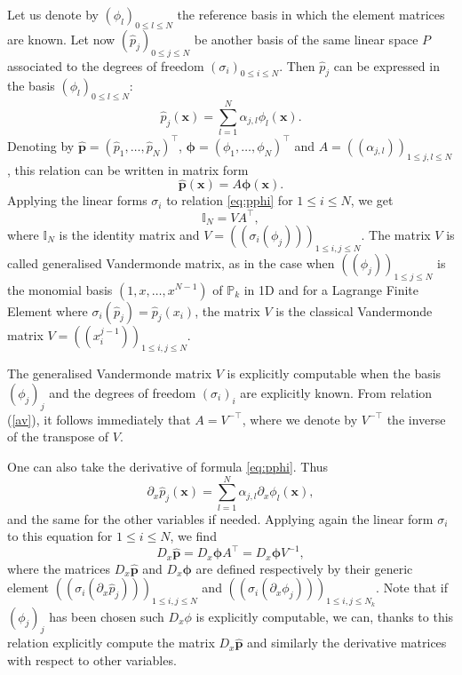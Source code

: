 Let us denote by $(\phi_l)_{0\leq l\leq N}$ the reference basis in which the element matrices are known. 
Let now $(\hat{p}_j)_{0\leq j\leq N}$ be another basis of the same linear space $P$ associated to the degrees of freedom $(\sigma_i)_{0\leq i\leq N}$.
Then $\hat{p}_j$ can be expressed in the basis $(\phi_l)_{0\leq l\leq N}$:
\begin{equation}\label{eq:pphi}
\hat{p}_j(\mathbf{x}) = \sum_{l=1}^{N} \alpha_{j,l} \phi_l(\mathbf{x}).
\end{equation}
Denoting by $\hat{\mathbf{p}}=(\hat{p}_1,\dots,\hat{p}_{N})^\top$, $\boldsymbol{\phi}=(\phi_1,\dots,\phi_{N})^\top$ and $A=((\alpha_{j,l}))_{1\leq j,l \leq N}$, this relation can be written in matrix form
$$
\hat{\mathbf{p}}(\mathbf{x}) = A \boldsymbol{\phi}(\mathbf{x}).
$$
Applying the linear forms $\sigma_i$ to relation  \eqref{eq:pphi} for $1\leq i\leq N$, we get 
\begin{equation}\label{av}
\mathbb{I}_{N} = VA^\top,
\end{equation}
where $ \mathbb{I}_{N}$ is the identity matrix and $V=((\sigma_i(\phi_j)))_{1\leq i,j \leq N}$. The matrix $V$ is called generalised Vandermonde matrix, as in the case when  $((\phi_j))_{1\leq j \leq N}$ is the monomial basis $(1, x, \dots, x^{N-1})$ of $ \mathbb{P}_k$ in
1D and for a Lagrange Finite Element where $\sigma_i(\hat{p}_j)= \hat{p}_j(x_i)$, the matrix $V$ is the classical Vandermonde matrix $V=((x_i^{j-1}))_{1\leq i,j \leq N}$.

The generalised  Vandermonde matrix $V$ is explicitly  computable when the basis $(\phi_j)_j$ and the degrees of freedom $(\sigma_i)_i$ are explicitly known. 
From relation (\ref{av}), it follows immediately that $A=V^{-\top}$, where we denote by $V^{-\top}$
the inverse of the transpose of $V$.

One can also take the derivative of formula \eqref{eq:pphi}. Thus
$$\partial_{x}\hat{p}_j(\mathbf{x}) = \sum_{l=1}^{N} \alpha_{j,l} \partial_x\phi_l(\mathbf{x}),$$
and the same for the other variables if needed.
Applying again the linear form $\sigma_i$ to this equation for $1\leq i\leq N$,  we find
$$D_x\hat{\mathbf{p}} = D_x\boldsymbol{\phi}A^\top=D_x\boldsymbol{\phi}V^{-1} ,$$
where the matrices $D_x\hat{\mathbf{p}}$ and  $D_x\boldsymbol{\phi}$ are defined respectively
by their generic element $((\sigma_i(\partial_x \hat{p}_j)))_{1\leq i,j \leq N}$ 
and $((\sigma_i(\partial_x \phi_j)))_{1\leq i,j \leq N_k}$. Note that if
$(\phi_j)_j$ has been chosen such $D_x\phi$ is explicitly computable, we can, thanks to this relation explicitly compute the matrix $D_x\hat{\mathbf{p}}$ and similarly the derivative matrices with respect to other variables.

